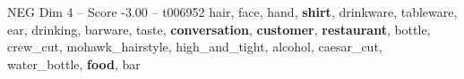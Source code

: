 \begin{textsample}{NEG Dim 4 – Score -3.00 – t006952}  \label{ex:f4_neg_006}
hair, face, hand, \textbf{shirt}, drinkware, tableware, ear, drinking, barware, taste, \textbf{conversation}, \textbf{customer}, \textbf{restaurant}, bottle, crew\_cut, mohawk\_hairstyle, high\_and\_tight, alcohol, caesar\_cut, water\_bottle, \textbf{food}, bar

\end{textsample}
